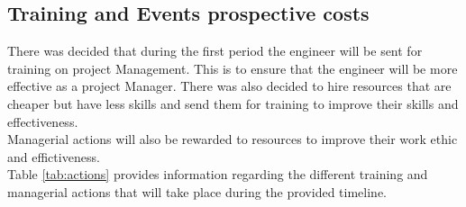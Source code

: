 \subsection{Training and Events prospective costs}

There was decided that during the first period the engineer will be sent for training on project Management. This is to ensure that the engineer will be more effective as a project Manager. There was also decided to hire resources that are cheaper but have less skills and send them for training to improve their skills and effectiveness.\\

\noindent
Managerial actions will also be rewarded to resources to improve their work ethic and effictiveness.\\

\noindent
Table \ref{tab:actions} provides information regarding the different training and managerial actions that will take place during the provided timeline.

